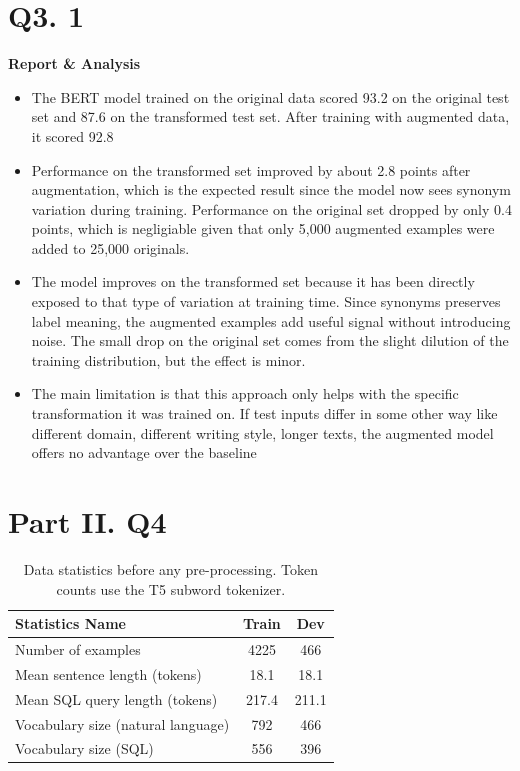 \documentclass{article}
\begin{document}
\section*{Q3. 1}
\textbf{Report \& Analysis}
    \begin{itemize}
        \item The BERT model trained on the original data scored 93.2 on the original test set and 87.6 on the transformed test set. After training with augmented data, it scored 92.8%

        \item Performance on the transformed set improved by about 2.8 points after augmentation, which is the expected result since the model now sees synonym variation during training. Performance on the original set dropped by only 0.4 points, which is negligiable given that only 5{,}000 augmented examples were added to 25{,}000 originals.

        \item The model improves on the transformed set because it has been directly exposed to that type of variation at training time. Since synonyms preserves label meaning, the augmented examples add useful signal without introducing noise. The small drop on the original set comes from the slight dilution of the training distribution, but the effect is minor.

        \item The main limitation is that this approach only helps with the specific transformation it was trained on. If test inputs differ in some other way like different domain, different writing style, longer texts, the augmented model offers no advantage over the baseline
    \end{itemize}

\section*{Part II. Q4}

\begin{table}[h!]
\centering
\begin{tabular}{lcc}
\toprule
Statistics Name & Train & Dev \\
\midrule
Number of examples & 4225 & 466 \\
Mean sentence length (tokens) & 18.1 & 18.1 \\
Mean SQL query length (tokens) & 217.4 & 211.1 \\
Vocabulary size (natural language) & 792 & 466 \\
Vocabulary size (SQL) & 556 & 396 \\
\bottomrule
\end{tabular}
\caption{Data statistics before any pre-processing. Token counts use the T5 subword tokenizer.}
\label{tab:data_stats_before}
\end{table}
\end{document}
